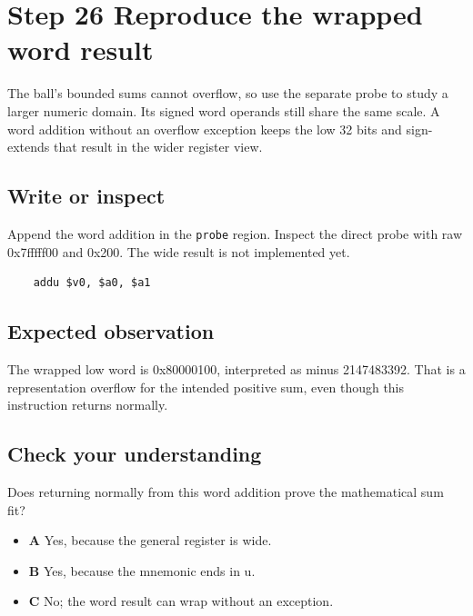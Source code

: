 \section{Step 26 Reproduce the wrapped word result}\label{ball-s26}

The ball’s bounded sums cannot overflow, so use the separate probe to study a larger numeric domain. Its signed word operands still share the same scale. A word addition without an overflow exception keeps the low 32 bits and sign-extends that result in the wider register view.

\subsection{Write or inspect}
Append the word addition in the \texttt{probe} region. Inspect the direct probe with raw 0x7fffff00 and 0x200. The wide result is not implemented yet.

\begin{verbatim}
    addu $v0, $a0, $a1
\end{verbatim}

\subsection{Expected observation}
The wrapped low word is 0x80000100, interpreted as minus 2147483392. That is a representation overflow for the intended positive sum, even though this instruction returns normally.

\subsection{Check your understanding}
Does returning normally from this word addition prove the mathematical sum fit?

\begin{itemize}
  \item \textbf{A} Yes, because the general register is wide.
  \item \textbf{B} Yes, because the mnemonic ends in u.
  \item \textbf{C} No; the word result can wrap without an exception.
\end{itemize}
